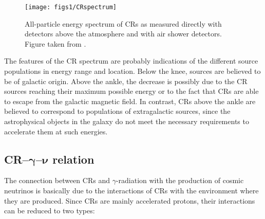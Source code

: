 \begin{figure}[htbp]
	\centering
	\texttt{[image: figs1/CRspectrum]}
	\caption{\label{fig:CR}All-particle energy spectrum of CRs as measured directly with detectors above the atmosphere and with air shower detectors. Figure taken from \cite{energy_spec}.}
\end{figure}

The features of the CR spectrum are probably indications of the different source populations in energy range and location. Below the knee, sources are believed to be of galactic origin. Above the ankle, the decrease is possibly due to the CR sources reaching their maximum possible energy or to the fact that CRs are able to escape from the galactic magnetic field. In contrast, CRs above the ankle are believed to correspond to populations of extragalactic sources, since the astrophysical objects in the galaxy do not meet the necessary requirements to accelerate them at such energies.

\subsection{CR--$\boldsymbol{\gamma}$--$\boldsymbol{\nu}$ relation}
\label{sec:CR-gamma}


The connection between CRs and $\gamma$-radiation with the production of cosmic neutrinos is basically due to the interactions of CRs with the environment where they are produced. Since CRs are mainly accelerated protons, their interactions can be reduced to two types:

